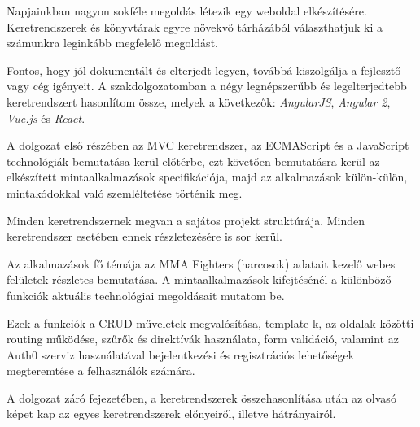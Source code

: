 

Napjainkban nagyon sokféle megoldás létezik egy weboldal elkészítésére. Keretrendszerek és könyvtárak egyre növekvő tárházából választhatjuk ki a számunkra leginkább megfelelő megoldást.

Fontos, hogy jól dokumentált és elterjedt legyen, továbbá kiszolgálja a fejlesztő vagy cég igényeit. A szakdolgozatomban a négy legnépszerűbb és legelterjedtebb keretrendszert hasonlítom össze, melyek a következők: \textit{AngularJS}, \textit{Angular 2}, \textit{Vue.js} és \textit{React}.

A dolgozat első részében az MVC keretrendszer, az ECMAScript és a JavaScript technológiák bemutatása kerül előtérbe, ezt követően bemutatásra kerül az elkészített mintaalkalmazások specifikációja, majd az alkalmazások külön-külön, mintakódokkal való szemléltetése történik meg.

Minden keretrendszernek megvan a sajátos projekt struktúrája. Minden keretrendszer esetében ennek részletezésére is sor kerül.

Az alkalmazások fő témája az MMA Fighters (harcosok) adatait kezelő webes felületek részletes bemutatása. A mintaalkalmazások kifejtésénél a különböző funkciók aktuális technológiai megoldásait mutatom be.

Ezek a funkciók a CRUD műveletek megvalósítása, template-k, az oldalak közötti routing működése, szűrők és direktívák használata, form validáció, valamint az Auth0 szerviz használatával bejelentkezési és regisztrációs lehetőségek megteremtése a felhasználók számára.

A dolgozat záró fejezetében, a keretrendszerek összehasonlítása után az olvasó képet kap az egyes keretrendszerek előnyeiről, illetve hátrányairól.
